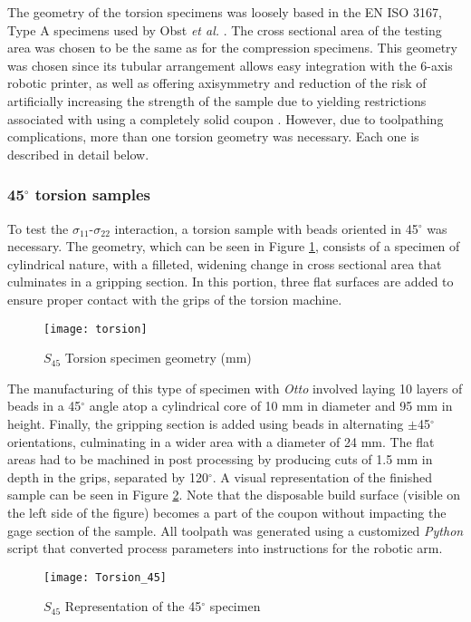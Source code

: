 \documentclass[main.tex]{subfiles}
\begin{document}
The geometry of the torsion specimens was loosely based in the EN ISO 3167, Type A specimens used by Obst \emph{et al.} \cite{Obst2018}. The cross sectional area of the testing area was chosen to be the same as for the compression specimens. This geometry was chosen since its tubular arrangement allows easy integration with the 6-axis robotic printer, as well as offering axisymmetry and reduction of the risk of artificially increasing the strength of the sample due to yielding restrictions associated with using a completely solid coupon \cite{Obst2018}. However, due to toolpathing complications, more than one torsion geometry was necessary. Each one is described in detail below.  

\subsubsection{45$^\circ$ torsion samples}

To test the $\sigma_{11}$-$\sigma_{22}$ interaction, a torsion sample with beads oriented in 45$^\circ$ was necessary. The geometry, which can be seen in Figure \ref{fig:tors45}, consists of a specimen of cylindrical nature, with a filleted, widening change in cross sectional area that culminates in a gripping section. In this portion, three flat surfaces are added to ensure proper contact with the grips of the torsion machine. 
\begin{figure}[h]
	\center
	\texttt{[image: torsion]}
	\caption{$S_{45}$ Torsion specimen geometry (mm)} \label{fig:tors45}
\end{figure}

The manufacturing of this type of specimen with \emph{Otto} involved laying 10 layers of beads in a 45$^\circ$ angle atop a cylindrical core of 10 mm in diameter and 95 mm in height. Finally, the gripping section is added using beads in alternating  $\pm$45$^\circ$ orientations, culminating in a wider area with a diameter of 24 mm. The flat areas had to be machined in post processing by producing cuts of 1.5 mm in depth in the grips, separated by 120$^\circ$. A visual representation of the finished sample can be seen in Figure \ref{fig:tors45d}. Note that the disposable build surface (visible on the left side of the figure) becomes a part of the coupon without impacting the gage section of the sample. All toolpath was generated using a customized  \emph{Python} script that converted process parameters into instructions for the robotic arm.
\begin{figure}[!htbp]
	\center
	\texttt{[image: Torsion\_45]}
	\caption{$S_{45}$ Representation of the 45$^\circ$ specimen} \label{fig:tors45d}
\end{figure}
\end{document}

